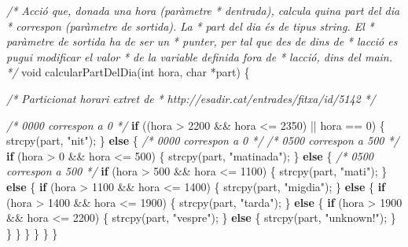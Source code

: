\documentclass[]{book}
\newenvironment{Shaded}{\begin{snugshade}}{\end{snugshade}}
\newcommand{\CommentTok}[1]{\textcolor[rgb]{0.56,0.35,0.01}{\textit{#1}}}
\newcommand{\ControlFlowTok}[1]{\textcolor[rgb]{0.13,0.29,0.53}{\textbf{#1}}}
\newcommand{\DataTypeTok}[1]{\textcolor[rgb]{0.13,0.29,0.53}{#1}}
\newcommand{\DecValTok}[1]{\textcolor[rgb]{0.00,0.00,0.81}{#1}}
\newcommand{\NormalTok}[1]{#1}
\newcommand{\StringTok}[1]{\textcolor[rgb]{0.31,0.60,0.02}{#1}}
\begin{document}
\begin{Shaded}
\begin{Highlighting}[]
\CommentTok{/* Acció que, donada una hora (paràmetre}
\CommentTok{ * d\textquotesingle{}entrada), calcula quina part del dia}
\CommentTok{ * correspon (paràmetre de sortida). La}
\CommentTok{ * part del dia és de tipus string. El}
\CommentTok{ * paràmetre de sortida ha de ser un }
\CommentTok{ * punter, per tal que des de dins de}
\CommentTok{ * l\textquotesingle{}acció es pugui modificar el valor}
\CommentTok{ * de la variable definida fora de }
\CommentTok{ * l\textquotesingle{}acció, dins del main.}
\CommentTok{ */}
\DataTypeTok{void}\NormalTok{ calcularPartDelDia(}\DataTypeTok{int}\NormalTok{ hora, }\DataTypeTok{char}\NormalTok{ *part) \{}

    \CommentTok{/* Particionat horari extret de}
\CommentTok{     * http://esadir.cat/entrades/fitxa/id/5142}
\CommentTok{     */}

    \CommentTok{/* 0000 correspon a 0 */}
    \ControlFlowTok{if}\NormalTok{ ((hora \textgreater{} }\DecValTok{2200}\NormalTok{ \&\& hora \textless{}= }\DecValTok{2350}\NormalTok{) || hora == }\DecValTok{0}\NormalTok{) \{}
\NormalTok{        strcpy(part, }\StringTok{"nit"}\NormalTok{);}
\NormalTok{    \} }\ControlFlowTok{else}\NormalTok{ \{}
        \CommentTok{/* 0000 correspon a 0 */}
        \CommentTok{/* 0500 correspon a 500 */}
        \ControlFlowTok{if}\NormalTok{ (hora \textgreater{} }\DecValTok{0}\NormalTok{ \&\& hora \textless{}= }\DecValTok{500}\NormalTok{) \{}
\NormalTok{            strcpy(part, }\StringTok{"matinada"}\NormalTok{);}
\NormalTok{        \} }\ControlFlowTok{else}\NormalTok{ \{}
            \CommentTok{/* 0500 correspon a 500 */}
            \ControlFlowTok{if}\NormalTok{ (hora \textgreater{} }\DecValTok{500}\NormalTok{ \&\& hora \textless{}= }\DecValTok{1100}\NormalTok{) \{}
\NormalTok{                strcpy(part, }\StringTok{"mati"}\NormalTok{);}
\NormalTok{            \} }\ControlFlowTok{else}\NormalTok{ \{}
                \ControlFlowTok{if}\NormalTok{ (hora \textgreater{} }\DecValTok{1100}\NormalTok{ \&\& hora \textless{}= }\DecValTok{1400}\NormalTok{) \{}
\NormalTok{                    strcpy(part, }\StringTok{"migdia"}\NormalTok{);}
\NormalTok{                \} }\ControlFlowTok{else}\NormalTok{ \{}
                    \ControlFlowTok{if}\NormalTok{ (hora \textgreater{} }\DecValTok{1400}\NormalTok{ \&\& hora \textless{}= }\DecValTok{1900}\NormalTok{) \{}
\NormalTok{                        strcpy(part, }\StringTok{"tarda"}\NormalTok{);}
\NormalTok{                    \} }\ControlFlowTok{else}\NormalTok{ \{}
                        \ControlFlowTok{if}\NormalTok{ (hora \textgreater{} }\DecValTok{1900}\NormalTok{ \&\& hora \textless{}= }\DecValTok{2200}\NormalTok{) \{}
\NormalTok{                            strcpy(part, }\StringTok{"vespre"}\NormalTok{);}
\NormalTok{                        \} }\ControlFlowTok{else}\NormalTok{ \{}
\NormalTok{                            strcpy(part, }\StringTok{"unknown!"}\NormalTok{);}
\NormalTok{                        \}}
\NormalTok{                    \}}
\NormalTok{                \}}
\NormalTok{            \}}
\NormalTok{        \}}
\NormalTok{    \}}
\NormalTok{\}}
\end{Highlighting}
\end{Shaded}
\end{document}
